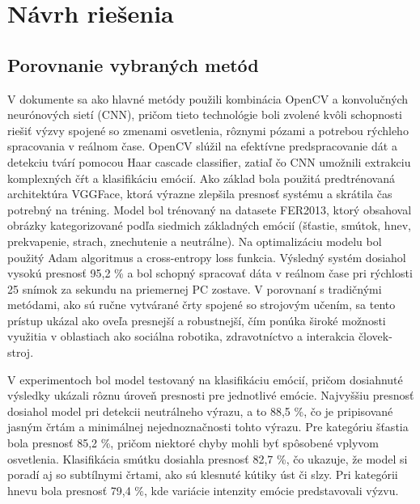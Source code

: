 \section{Návrh riešenia}        %
\subsection{Porovnanie vybraných metód}
V dokumente sa ako hlavné metódy použili kombinácia OpenCV a konvolučných neurónových sietí (CNN), pričom tieto technológie boli zvolené kvôli schopnosti riešiť výzvy 
spojené so zmenami osvetlenia, rôznymi pózami a potrebou rýchleho spracovania v reálnom čase. OpenCV slúžil na efektívne predspracovanie dát a 
detekciu tvárí pomocou Haar cascade classifier, zatiaľ čo CNN umožnili extrakciu komplexných čŕt a klasifikáciu emócií. Ako základ bola použitá predtrénovaná
architektúra VGGFace, ktorá výrazne zlepšila presnosť systému a skrátila čas potrebný na tréning. Model bol trénovaný na datasete FER2013, ktorý obsahoval obrázky
kategorizované podľa siedmich základných emócií (šťastie, smútok, hnev, prekvapenie, strach, znechutenie a neutrálne). Na optimalizáciu modelu bol použitý Adam 
algoritmus a cross-entropy loss funkcia. Výsledný systém dosiahol vysokú presnosť 95,2 \% a bol schopný spracovať dáta v reálnom čase pri rýchlosti 25 snímok
za sekundu na priemernej PC zostave. V porovnaní s tradičnými metódami, ako sú ručne vytvárané črty spojené so strojovým učením, sa tento prístup ukázal ako 
oveľa presnejší a robustnejší, čím ponúka široké možnosti využitia v oblastiach ako sociálna robotika, zdravotníctvo a interakcia človek-stroj.\cite{inProceedings02}

V experimentoch bol model testovaný na klasifikáciu emócií, pričom dosiahnuté výsledky ukázali rôznu úroveň presnosti pre jednotlivé emócie. 
Najvyššiu presnosť dosiahol model pri detekcii neutrálneho výrazu, a to 88,5 \%, čo je pripisované jasným črtám a minimálnej nejednoznačnosti tohto výrazu. 
Pre kategóriu šťastia bola presnosť 85,2 \%, pričom niektoré chyby mohli byť spôsobené vplyvom osvetlenia. Klasifikácia smútku dosiahla presnosť 82,7 \%, 
čo ukazuje, že model si poradí aj so subtílnymi črtami, ako sú klesnuté kútiky úst či slzy. Pri kategórii hnevu bola presnosť 79,4 \%, kde variácie intenzity emócie 
predstavovali výzvu.\cite{inProceedings02}

